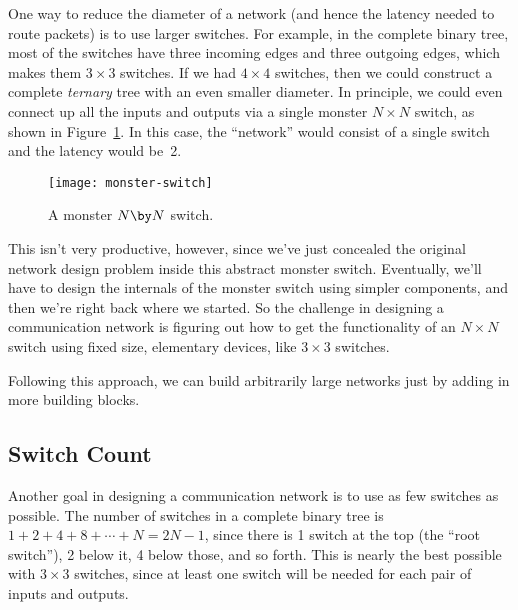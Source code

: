One way to reduce the diameter of a network (and hence the latency
needed to route packets) is to use larger switches.  For example, in
the complete binary tree, most of the switches have three incoming
edges and three outgoing edges, which makes them $3 \times 3$
switches.  If we had $4 \times 4$ switches, then we could construct a
complete \emph{ternary} tree with an even smaller diameter.  In
principle, we could even connect up all the inputs and outputs via a
single monster $N \times N$ switch, as shown in Figure~\ref{fig:6EI}.
In this case, the ``network'' would consist of a single switch and the
latency would be~2.

\begin{figure}


\texttt{[image: monster-switch]}

\caption{A monster $N \by N$ switch.}

\label{fig:6EI}

\end{figure}

This isn't very productive, however, since we've just concealed the
original network design problem inside this abstract monster switch.
Eventually, we'll have to design the internals of the monster switch
using simpler components, and then we're right back where we started.
So the challenge in designing a communication network is figuring out
how to get the functionality of an $N \times N$ switch using fixed
size, elementary devices, like $3 \times 3$ switches.
\begin{solution}
Following this approach, we can build arbitrarily large networks
just by adding in more building blocks. 
\end{solution}

\subsection{Switch Count}

Another goal in designing a communication network is to use as few
switches as possible.  The number of switches in a complete binary
tree is $1 + 2 + 4 + 8 + \cdots + N = 2N - 1$, since there is 1 switch
at the top (the ``root switch''), 2 below it, 4 below those, and so
forth.  This is nearly the best possible with $3 \times 3$ switches,
since at least one switch will be needed for each pair of inputs and
outputs.


